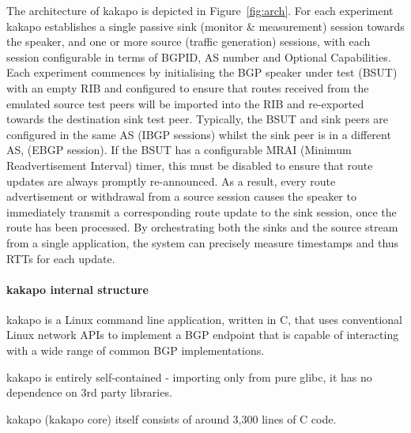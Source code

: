 The architecture of kakapo is depicted in Figure~\ref{fig:arch}.
For each experiment kakapo establishes a single passive sink (monitor \& measurement) session towards the speaker, and one or more source (traffic generation) sessions, with each session configurable in terms of BGPID, AS number and Optional Capabilities.
Each experiment commences by initialising the BGP speaker under test (BSUT) with an empty RIB and configured to ensure that routes received from the emulated source test peers will be imported into the RIB and re-exported towards the destination sink test peer.
Typically, the BSUT and sink peers are configured in the same AS (IBGP sessions) whilst the sink peer is in a different AS, (EBGP session).
If the BSUT has a configurable MRAI (Minimum Readvertisement Interval) timer, this must be disabled to ensure that route updates are always promptly re-announced.
As a result, every route advertisement or withdrawal from a source session causes the speaker to immediately transmit a corresponding route update to the sink session, once the route has been processed.
By orchestrating both the sinks and the source stream from a single application, the system can precisely measure timestamps and thus RTTs for each update.

\paragraph{kakapo internal structure}

\begin{myitemize}
    \item kakapo is a Linux command line application,  written in C, that uses conventional Linux network APIs to implement a BGP endpoint that is capable of interacting with a wide range of common BGP implementations.
    \item kakapo is entirely  self-contained - importing only from pure glibc, it has no dependence on 3rd party libraries.
    \item kakapo (kakapo core) itself consists of around 3,300 lines of C code.
\end{myitemize}

